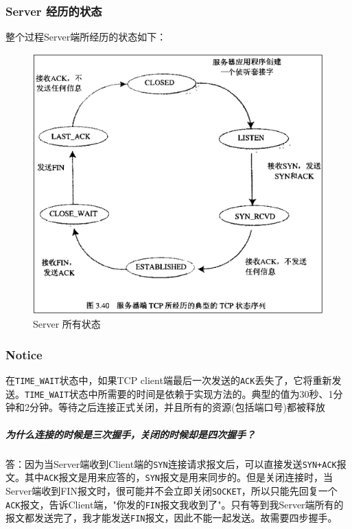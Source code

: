\documentclass[UTF8,a4paper,12pt]{ctexbook}
\begin{document}
			\subsubsection{Server 经历的状态}
			整个过程Server端所经历的状态如下：
			\begin{figure}[ht]
				\centering
				\includegraphics[scale = 0.7]{figures/Server-status.png}
				\caption{Server 所有状态}
				\label{serverStatus}
			\end{figure}	
			
			\subsubsection{Notice}
				在\verb|TIME_WAIT|状态中，如果TCP client端最后一次发送的\verb|ACK|丢失了，它将重新发送。\verb|TIME_WAIT|状态中所需要的时间是依赖于实现方法的。典型的值为30秒、1分钟和2分钟。等待之后连接正式关闭，并且所有的资源(包括端口号)都被释放
				
				\subparagraph{为什么连接的时候是三次握手，关闭的时候却是四次握手？}
					答：因为当Server端收到Client端的\verb|SYN|连接请求报文后，可以直接发送\verb|SYN+ACK|报文。其中\verb|ACK|报文是用来应答的，\verb|SYN|报文是用来同步的。但是关闭连接时，当Server端收到FIN报文时，很可能并不会立即关闭\verb|SOCKET|，所以只能先回复一个\verb|ACK|报文，告诉Client端，"你发的\verb|FIN|报文我收到了"。只有等到我Server端所有的报文都发送完了，我才能发送\verb|FIN|报文，因此不能一起发送。故需要四步握手。
					
\end{document}
